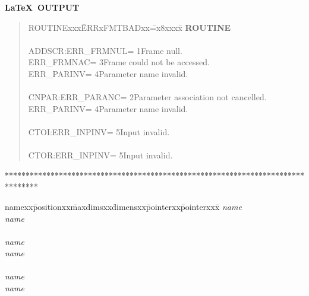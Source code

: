 \newpage

\begin{center}
{\bf \LaTeX\ OUTPUT}
\end{center}

\begin{quote}
\begin{tabbing}
ROUTINExxx\=ERRxFMTBADxx\==x8xxxx\=\kill
{\bf ROUTINE}\>\\
\\
ADDSCR:\>ERR\_FRMNUL\>= 1\>Frame null.\\
\>ERR\_FRMNAC\>= 3\>Frame could not be accessed.\\
\>ERR\_PARINV\>= 4\>Parameter name invalid.\\
\\
CNPAR:\>ERR\_PARANC\>= 2\>Parameter association not cancelled.\\
\>ERR\_PARINV\>= 4\>Parameter name invalid.\\
\\
CTOI:\>ERR\_INPINV\>= 5\>Input invalid.\\
\\
CTOR:\>ERR\_INPINV\>= 5\>Input invalid.\\
\end{tabbing}
\end{quote}

********************************************************************************

\begin{tabbing}
namexx\=positionxx\=maxdimsxx\=dimensxx\=pointerxx\=pointerxxx\=\kill
{\em name}\>\\
{\em name}\>\>\>\\
\\
{\em name}\>\\
{\em name}\>\>\\
\\
{\em name}\\
{\em name}\>\\
\end{tabbing}

\newpage

